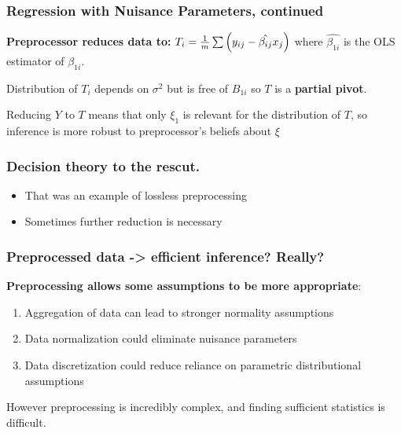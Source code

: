 \documentclass[10pt, compress]{beamer}
\begin{document}
\begin{frame}[fragile]
    \frametitle{Regression with Nuisance Parameters, continued}
   
    \textbf{Preprocessor reduces data to:} $T_i = \frac{1}{m}\sum\del{y_{ij} - \hat{\beta_{ij}}x_j}$ where $\hat{\beta_{1i}}$ is the OLS estimator of $\beta_{1i}$.
    
    \vspace*{5mm}
    
    Distribution of $T_i$ depends on $\sigma^2$ but is free of $B_{1i}$ so $T$ is a \textbf{partial pivot}. 
    
    Reducing $Y$ to $T$ means that only $\xi_1$ is relevant for the distribution of $T$, so inference is more robust to preprocessor's beliefs about $\xi$
    
    
    
\end{frame}
\begin{frame}[fragile]
    \frametitle{Decision theory to the rescut.}
    \begin{itemize}
        \item That was an example of lossless preprocessing
        \item Sometimes further reduction is necessary
    \end{itemize}
\end{frame}

\begin{frame}[fragile]
    \frametitle{Preprocessed data -> efficient inference? Really?}

    
    \textbf{Preprocessing allows some assumptions to be more appropriate}:

    \begin{enumerate}
    \item Aggregation of data can lead to stronger normality assumptions
    \item Data normalization could eliminate nuisance parameters
    \item Data discretization could reduce reliance on parametric distributional assumptions
    \end{enumerate}
    
    However preprocessing is incredibly complex, and finding sufficient statistics is difficult. 

\end{frame}
\end{document}
